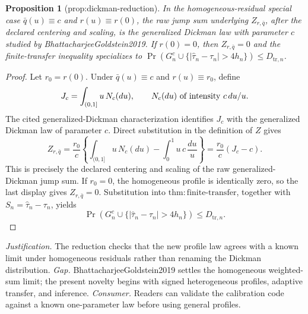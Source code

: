\documentclass{article}
\newtheorem{proposition}{Proposition}
\begin{document}
\begin{proposition}[prop:dickman-reduction]\label{prop:dickman-reduction}
In the homogeneous-residual special case \(\bar q(u)\equiv c\) and \(r(u)\equiv r(0)\), the raw jump sum underlying \(Z_{r,\bar q}\), after the declared centering and scaling, is the generalized Dickman law with parameter \(c\) studied by BhattacharjeeGoldstein2019. If \(r(0)=0\), then \(Z_{r,\bar q}=0\) and the finite-transfer inequality specializes to \(\Pr(G_n^c\cup\{|\widehat\tau_n-\tau_n|>4h_n\})\le D_{\mathrm{tr},n}\).
\end{proposition}
\begin{proof}
Let \(r_0=r(0)\).  Under \(\bar q(u)\equiv c\) and
\(r(u)\equiv r_0\), define
\[
 J_c=\int_{(0,1]}u\,N_c(du),\qquad
 N_c(du)\ \hbox{of intensity }c\,du/u.
\]
The cited generalized-Dickman characterization identifies \(J_c\) with the generalized Dickman law of parameter \(c\).  Direct substitution in the definition of \(Z\) gives
\[
 Z_{r,\bar q}
 =\frac{r_0}{c}\left\{\int_{(0,1]}u\,N_c(du)
       -\int_0^1u\,c\,\frac{du}{u}\right\}
 =\frac{r_0}{c}(J_c-c).
\]
This is precisely the declared centering and scaling of the raw generalized-Dickman jump sum.  If \(r_0=0\), the homogeneous profile is identically zero, so the last display gives \(Z_{r,\bar q}=0\).  Substitution into
\(\mathrm{thm:finite\mbox{-}transfer}\), together with
\(S_n=\widehat\tau_n-\tau_n\), yields
\[
 \Pr\!\left(G_n^c\cup
 \{|\widehat\tau_n-\tau_n|>4h_n\}\right)
 \leq D_{\mathrm{tr},n}.
\]
\end{proof}
\par\smallskip\noindent \textit{Justification.} The reduction checks that the new profile law agrees with a known limit under homogeneous residuals rather than renaming the Dickman distribution. \textit{Gap.} BhattacharjeeGoldstein2019 settles the homogeneous weighted-sum limit; the present novelty begins with signed heterogeneous profiles, adaptive transfer, and inference. \textit{Consumer.} Readers can validate the calibration code against a known one-parameter law before using general profiles.
\end{document}
